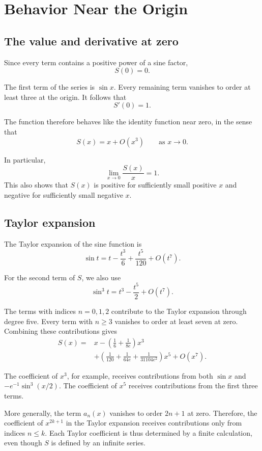 \documentclass[12pt]{article}
\theoremstyle{definition}
\theoremstyle{remark}
\begin{document}
\section{Behavior Near the Origin}

\subsection{The value and derivative at zero}

Since every term contains a positive power of a sine factor,
\[
S(0)=0.
\]

The first term of the series is \(\sin x\). Every remaining
term vanishes to order at least three at the origin.
It follows that
\[
S'(0)=1.
\]

The function therefore behaves like the identity function
near zero, in the sense that
\[
S(x)=x+O(x^3)
\qquad\text{as }x\to 0.
\]

In particular,
\[
\lim_{x\to 0}\frac{S(x)}{x}=1.
\]
This also shows that \(S(x)\) is positive for sufficiently
small positive \(x\) and negative for sufficiently small
negative \(x\).

\subsection{Taylor expansion}

The Taylor expansion of the sine function is
\[
\sin t=t-\frac{t^3}{6}+\frac{t^5}{120}+O(t^7).
\]

For the second term of \(S\), we also use
\[
\sin^3 t=t^3-\frac{t^5}{2}+O(t^7).
\]

The terms with indices \(n=0,1,2\) contribute to the
Taylor expansion through degree five. Every term with
\(n\geq 3\) vanishes to order at least seven at zero.
Combining these contributions gives
\begin{align}
S(x)
={}&x-
\left(\frac{1}{6}+\frac{1}{8e}\right)x^3
\nonumber\\
&+
\left(
\frac{1}{120}
+\frac{1}{64e}
+\frac{1}{31104e^2}
\right)x^5
+O(x^7).
\label{eq:taylor}
\end{align}

The coefficient of \(x^3\), for example, receives
contributions from both \(\sin x\) and
\(-e^{-1}\sin^3(x/2)\). The coefficient of \(x^5\)
receives contributions from the first three terms.

More generally, the term \(a_n(x)\) vanishes to order
\(2n+1\) at zero. Therefore, the coefficient of \(x^{2k+1}\)
in the Taylor expansion receives contributions only from
indices \(n\leq k\). Each Taylor coefficient is thus
determined by a finite calculation, even though \(S\) is
defined by an infinite series.
\end{document}
